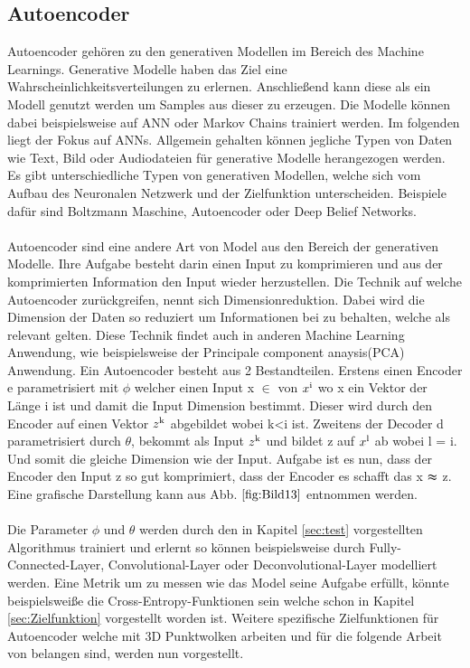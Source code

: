 \documentclass{llncs}
\begin{document}
\subsection{Autoencoder}\label{sec:autoencoder}

Autoencoder gehören zu den generativen Modellen im Bereich des Machine Learnings. Generative Modelle haben das Ziel eine Wahrscheinlichkeitsverteilungen zu erlernen. Anschließend kann diese als ein Modell genutzt werden um Samples aus dieser zu erzeugen. Die Modelle können dabei beispielsweise auf ANN oder Markov Chains trainiert werden\cite{Grundlagen}. Im folgenden liegt der Fokus auf ANNs. Allgemein gehalten können jegliche Typen von Daten wie Text, Bild oder Audiodateien für generative Modelle herangezogen werden. Es gibt unterschiedliche Typen von generativen Modellen, welche sich vom Aufbau des Neuronalen Netzwerk und der Zielfunktion unterscheiden. Beispiele dafür sind Boltzmann Maschine, Autoencoder oder Deep Belief Networks\cite{Grundlagen}. 
\\\\
Autoencoder sind eine andere Art von Model aus den Bereich der generativen Modelle. Ihre Aufgabe besteht darin einen Input zu komprimieren und aus der komprimierten Information den Input wieder herzustellen. Die Technik auf welche Autoencoder zurückgreifen, nennt sich Dimensionreduktion. Dabei wird die Dimension der Daten so reduziert um Informationen bei zu behalten, welche als relevant gelten. Diese Technik findet auch in anderen Machine Learning Anwendung, wie beispielsweise der Principale component anaysis(PCA) Anwendung\cite{dimreduction}.  Ein Autoencoder besteht aus 2 Bestandteilen. Erstens einen Encoder e parametrisiert mit $\phi$ welcher einen Input x $\in$ von $x\textsuperscript{i}$ wo x ein Vektor der Länge i ist und damit die Input Dimension bestimmt. Dieser wird durch den Encoder auf einen Vektor $z\textsuperscript{k}$ abgebildet wobei k<i ist. Zweitens der Decoder d parametrisiert durch  $\theta$, bekommt als Input $z\textsuperscript{k}$ und bildet z auf $x\textsuperscript{l}$ ab wobei l = i. Und somit die gleiche Dimension wie der Input. Aufgabe ist es nun, dass der Encoder den Input z so gut komprimiert, dass der Encoder es schafft das x $\thickapprox$ z. Eine grafische Darstellung kann aus Abb. $\ref{fig:Bild13}$ entnommen werden\cite{Grundlagen}. 
\\\\
Die Parameter $\phi$ und $\theta$ werden durch den in Kapitel \ref{sec:test} vorgestellten Algorithmus trainiert und erlernt so können beispielsweise durch Fully-Connected-Layer, Convolutional-Layer oder Deconvolutional-Layer modelliert werden. Eine Metrik um zu messen wie das Model seine Aufgabe erfüllt, könnte beispielsweiße die Cross-Entropy-Funktionen sein welche schon in Kapitel \ref{sec:Zielfunktion} vorgestellt worden ist. Weitere spezifische Zielfunktionen für Autoencoder welche mit 3D Punktwolken arbeiten und für die folgende Arbeit von belangen sind, werden nun vorgestellt.
\end{document}
